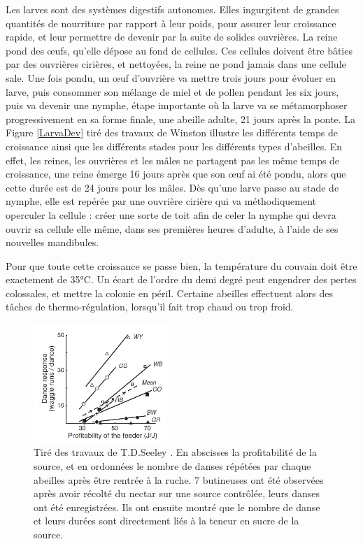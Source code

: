 			Les larves sont des systèmes digestifs autonomes. Elles ingurgitent de grandes quantités de nourriture par rapport à leur poids, pour assurer leur croissance rapide, et leur permettre de devenir par la suite de solides ouvrières. La reine pond des œufs, qu'elle dépose au fond de cellules. Ces cellules doivent être bâties par des ouvrières cirières, et nettoyées, la reine ne pond jamais dans une cellule sale. Une fois pondu, un œuf d'ouvrière va mettre trois jours pour évoluer en larve, puis consommer son mélange de miel et de pollen pendant les six jours, puis va devenir une nymphe, étape importante où la larve va se métamorphoser progressivement en sa forme finale, une abeille adulte, 21 jours après la ponte. La Figure \ref{LarvaDev} tiré des travaux de Winston \cite{winston_biology_1991} illustre les différents temps de croissance ainsi que les différents stades pour les différents types d'abeilles. En effet, les reines, les ouvrières et les mâles ne partagent pas les même temps de croissance, une reine émerge 16 jours après que son œuf ai été pondu, alors que cette durée est de 24 jours pour les mâles. Dès qu'une larve passe au stade de nymphe, elle est repérée par une ouvrière cirière qui va méthodiquement operculer la cellule : créer une sorte de toit afin de celer la nymphe qui devra ouvrir sa cellule elle même, dans ses premières heures d'adulte, à l'aide de ses nouvelles mandibules.
			
			Pour que toute cette croissance se passe bien, la température du couvain doit être exactement de 35°C. Un écart de l'ordre du demi degré peut engendrer des pertes colossales, et mettre la colonie en péril. Certaine abeilles effectuent alors des tâches de thermo-régulation, lorsqu'il fait trop chaud ou trop froid. 

	\begin{figure}
	\includegraphics[width=0.45\textwidth]{Pictures/Graphs/SeeleyWaggles.JPG}
	\caption{Tiré des travaux de T.D.Seeley \cite{seeley_wisdom_1995}. En abscisses la profitabilité de la source, et en ordonnées le nombre de danses répétées par chaque abeilles après être rentrée à la ruche. 7 butineuses ont été observées après avoir récolté du nectar sur une source contrôlée, leurs danses ont été enregistrées. Ils ont ensuite montré que le nombre de danse et leurs durées sont directement liés à la teneur en sucre de la source.}
	\label{SeeleyWaggles}
	\end{figure}
			
